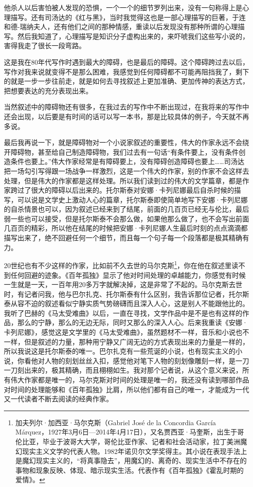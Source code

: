 \documentclass[fontset=fandol,12pt,a5paper]{ctexbook}
\begin{document}
他杀人以后害怕被人发现的恐惧，一个一个的细节罗列出来，没有一句称得上是心理描写。还有司汤达的《红与黑》，当时我觉得这也是一部心理描写的巨著，于连和德-瑞纳夫人，还有他们之间的那种情感，重读以后发现没有那种所谓的心理描写。然后我知道了，心理描写是知识分子虚构出来的，来吓唬我们这些写小说的，害得我走了很长一段弯路。

这是我在80年代写作时遇到最大的障碍，也是最后的障碍。这个障碍跨过去以后，写作对我来说就变得不是那么困难，我感觉到任何障碍都不可能再阻挡我了，剩下的就是一步一步往前走，就是如何去寻找叙述上更加准确、更加传神的表达方式，把想要表达的充分表现出来。

当然叙述中的障碍物还有很多，在我过去的写作中不断出现过，在我将来的写作中还会出现，以后要是有时间的话可以写一本书，那是比较具体的例子，今天就不再多说。

最后我再说一下，就是障碍物对一个小说家叙述的重要性，伟大的作家永远不会绕开障碍物，甚至给自己制造障碍物，我们过去有一句话“有条件要上，没有条件创造条件也要上。”伟大作家经常是有障碍要上，没有障碍创造障碍也要上……司汤达把一场勾引写得跟一场战争一样激烈，这是一个伟大的作家，别的作家不会这样去处理，但是伟大的作家都是这样处理。所以我们读到过的伟大的文学篇章，都是作家跨过了很大的障碍以后出来的。托尔斯泰对安娜·卡列尼娜最后自杀时候的描写，可以说是文学史上激动人心的篇章，托尔斯泰即使简单地写下安娜·卡列尼娜的自杀情景也可以，因为叙述已经来到了结尾，前面的几百页已经无与伦比，最后弱一些也可以接受，但是托尔斯泰不会那么做，如果他那么做了，也不会写出前面几百页的精彩，所以他在结尾的时候把安娜·卡列尼娜人生最后时刻的点点滴滴都描写出来了，绝不回避任何一个细节，而且每一个句子每一个段落都是极其精确有力。

20世纪也有不少这样的作家，比如前不久去世的马尔克斯\footnote{加夫列尔·加西亚·马尔克斯（Gabriel José de la Concordia García Márquez，1927年3月6日—2014年4月17日），又名贾西亚·马奎斯，出生于哥伦比亚，毕业于波哥大大学，哥伦比亚作家、记者和社会活动家，拉丁美洲魔幻现实主义文学的代表人物。1982年诺贝尔文学奖得主。其小说在表现手法上是魔幻现实主义的，“将真事隐去”，用魔幻的、离奇的、现实生活中不存在的事物和现象反映、体现、暗示现实生活。代表作有《百年孤独》《霍乱时期的爱情》。}，你在他在叙述里读不到任何回避的迹象。《百年孤独》显示了他对时间处理的卓越能力，你感觉有时候一生就是一天，一百年用20多万字就解决掉，这是非常了不起的。马尔克斯去世时，有记者问我，他与巴尔扎克、托尔斯泰有什么区别，我告诉那位记者，托尔斯泰从容不迫的叙述看似宁静实质气势磅礴而且深入人心，这是别人不能跟他比的。我听了巴赫的《马太受难曲》以后，一直在寻找，文学作品中是不是也有这样的作品，那么的宁静，那么的无边无际，同时又那么的深入人心。后来我重读《安娜·卡列尼娜》，感觉这是文学里的《马太受难曲》，虽然题材不一样，音乐和小说也不一样，但是叙述的力量，那种用宁静又广阔无边的方式表现出来的力量是一样的，所以我说这是托尔斯泰的唯一。巴尔扎克有一些荒诞的小说，也有现实主义的小说，你看他对人物的刻划丝丝入扣，感觉他对笔下人物的刻划像雕刻一样，是一刀一刀刻出来的，极其精确，而且栩栩如生。我对那个记者说，从这个意义来说，所有伟大作家都是唯一的，马尔克斯对时间的处理是唯一的，我还没有读到哪部作品对时间的处理能够和《百年孤独》比肩，所以他们都有自己的唯一，才能成为一代又一代读者不断去阅读的经典作家。
\end{document}
